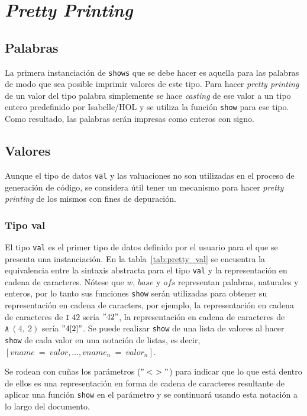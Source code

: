 \chapter{\textit{Pretty Printing}}
\label{ap:pretty_printing}

\section{Palabras}\label{section:pretty_words}
La primera instanciación de \verb|shows| que se debe hacer es aquella para las palabras de modo que sea posible imprimir valores de este tipo.
Para hacer \textit{pretty printing} de un valor del tipo palabra simplemente se hace \textit{casting} de ese valor a un tipo entero predefinido por Isabelle/HOL y se utiliza la función \verb|show| para ese tipo.
Como resultado, las palabras serán impresas como enteros con signo.

\section{Valores}\label{section:pretty_values}

Aunque el tipo de datos \verb|val| y las valuaciones no son utilizadas en el proceso de generación de código, se considera útil tener un mecanismo para hacer \textit{pretty printing} de los mismos con fines de depuración.

\subsection{Tipo val}\label{subsection:pretty_val_type}
El tipo \verb|val| es el primer tipo de datos definido por el usuario para el que se presenta una instanciación.
En la tabla~\ref{tab:pretty_val} se encuentra la equivalencia entre la sintaxis abstracta para el tipo \verb|val| y la representación en cadena de caracteres.
Nótese que $w$, $base$ y $ofs$ representan palabras, naturales y enteros, por lo tanto sus funciones \verb|show| serán utilizadas para obtener su representación en cadena de caracters, por ejemplo, la representación en cadena de caracteres de $\mathtt{I}\ 42$ sería $"42"$, la representación en cadena de caracteres de $\mathtt{A}\ (4,\ 2)$ sería $"4[2]"$.
Se puede realizar \verb|show| de una lista de valores al hacer \verb|show| de cada valor en una notación de listas, es decir, $[vname\ =\ valor, \dots, vname_n\ =\ valor_n]$.

Se rodean con cuñas los parámetros ($"<\ >"$) para indicar que lo que está dentro de ellos es una representación en forma de cadena de caracteres resultante de aplicar una función \verb|show| en el parámetro y se continuará usando esta notación a lo largo del documento.

